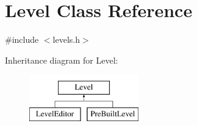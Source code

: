 \hypertarget{class_level}{}\section{Level Class Reference}
\label{class_level}


{\ttfamily \#include $<$levels.\+h$>$}

Inheritance diagram for Level\+:\begin{figure}[H]
\begin{center}
\leavevmode
\includegraphics[height=2.000000cm]{class_level}
\end{center}
\end{figure}
